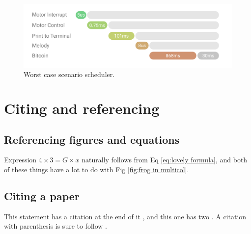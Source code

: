 \documentclass{article}
\begin{document}
\begin{figure}[H]
\begin{center}
   \includegraphics[width=0.9\linewidth]{scheduler.png}
\end{center}
   \caption{Worst case scenario scheduler.}
\label{fig:long}
\label{fig:onecol}
\end{figure}







\section{Citing and referencing}

\subsection{Referencing figures and equations}
 Expression $4\times 3=G\times x$ naturally follows from Eq \ref{eq:lovely formula}, and both of these things have a lot to do with Fig \ref{fig:frog in multicol}.
 
 \subsection{Citing a paper}
This statement has a citation at the end of it \cite{toadetal1958}, and this one has two \cite{toadetal1958, squeaker1982}. A citation with parenthesis is sure to follow \citep{siddiqi2004interspecific}.

 




\end{document}
